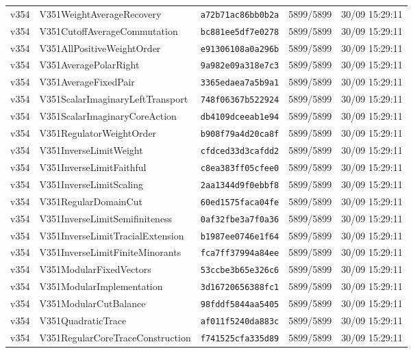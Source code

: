\documentclass[11pt]{article}
\theoremstyle{definition}\newtheorem{deriv}{Derivação}
\begin{document}
{\begin{longtable}{@{}lllll@{}}
v354 & V351WeightAverageRecovery & \texttt{a72b71ac86bb0b2a} & 5899/5899 & 30/09 15:29:11 \\
v354 & V351CutoffAverageCommutation & \texttt{bc881ee5df7e0278} & 5899/5899 & 30/09 15:29:11 \\
v354 & V351AllPositiveWeightOrder & \texttt{e91306108a0a296b} & 5899/5899 & 30/09 15:29:11 \\
v354 & V351AveragePolarRight & \texttt{9a982e09a318e7c3} & 5899/5899 & 30/09 15:29:11 \\
v354 & V351AverageFixedPair & \texttt{3365edaea7a5b9a1} & 5899/5899 & 30/09 15:29:11 \\
v354 & V351ScalarImaginaryLeftTransport & \texttt{748f06367b522924} & 5899/5899 & 30/09 15:29:11 \\
v354 & V351ScalarImaginaryCoreAction & \texttt{db4109dceeab1e94} & 5899/5899 & 30/09 15:29:11 \\
v354 & V351RegulatorWeightOrder & \texttt{b908f79a4d20ca8f} & 5899/5899 & 30/09 15:29:11 \\
v354 & V351InverseLimitWeight & \texttt{cfdced33d3cafdd2} & 5899/5899 & 30/09 15:29:11 \\
v354 & V351InverseLimitFaithful & \texttt{c8ea383ff05cfee0} & 5899/5899 & 30/09 15:29:11 \\
v354 & V351InverseLimitScaling & \texttt{2aa1344d9f0ebbf8} & 5899/5899 & 30/09 15:29:11 \\
v354 & V351RegularDomainCut & \texttt{60ed1575faca04fe} & 5899/5899 & 30/09 15:29:11 \\
v354 & V351InverseLimitSemifiniteness & \texttt{0af32fbe3a7f0a36} & 5899/5899 & 30/09 15:29:11 \\
v354 & V351InverseLimitTracialExtension & \texttt{b1987ee0746e1f64} & 5899/5899 & 30/09 15:29:11 \\
v354 & V351InverseLimitFiniteMinorants & \texttt{fca7ff37994a84ee} & 5899/5899 & 30/09 15:29:11 \\
v354 & V351ModularFixedVectors & \texttt{53ccbe3b65e326c6} & 5899/5899 & 30/09 15:29:11 \\
v354 & V351ModularImplementation & \texttt{3d16720656388fc1} & 5899/5899 & 30/09 15:29:11 \\
v354 & V351ModularCutBalance & \texttt{98fddf5844aa5405} & 5899/5899 & 30/09 15:29:11 \\
v354 & V351QuadraticTrace & \texttt{af011f5240da883c} & 5899/5899 & 30/09 15:29:11 \\
v354 & V351RegularCoreTraceConstruction & \texttt{f741525cfa335d89} & 5899/5899 & 30/09 15:29:11 \\

\end{longtable}}
\end{document}
